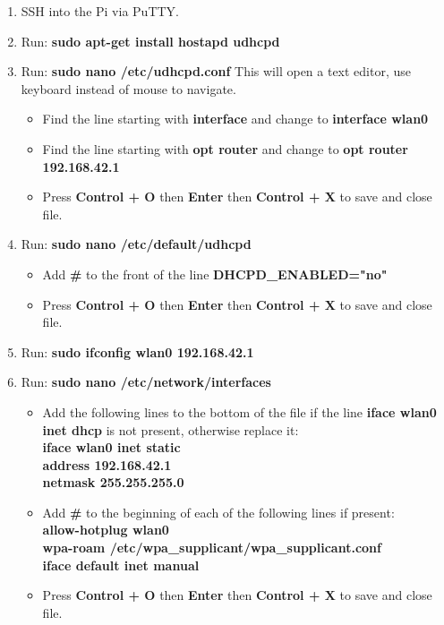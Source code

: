 \documentclass[titlepage,12pt,letter]{report}
\numberwithin{equation}{chapter}
\begin{document}
\begin{enumerate}[noitemsep,topsep=0pt]
	\item SSH into the Pi via PuTTY.
	\item Run: \textbf{sudo apt-get install hostapd udhcpd}
	\item Run: \textbf{sudo nano /etc/udhcpd.conf} This will open a text editor, use keyboard instead of mouse to navigate.
		\begin{itemize}[noitemsep,topsep=0pt]
			\item Find the line starting with \textbf{interface} and change to \textbf{interface wlan0}
			\item Find the line starting with \textbf{opt router} and change to \textbf{opt router 192.168.42.1}
			\item Press \textbf{Control + O} then \textbf{Enter} then \textbf{Control + X} to save and close file.
		\end{itemize}
	
	\item Run: \textbf{sudo nano /etc/default/udhcpd}
	\begin{itemize}[noitemsep,topsep=0pt]
		\item Add \textbf{\#} to the front of the line \textbf{DHCPD\_ENABLED="no"}
		\item Press \textbf{Control + O} then \textbf{Enter} then \textbf{Control + X} to save and close file.
	\end{itemize}

	\item Run: \textbf{sudo ifconfig wlan0 192.168.42.1}
	\item Run: \textbf{sudo nano /etc/network/interfaces}
	\begin{itemize}[noitemsep,topsep=0pt]
		\item Add the following lines to the bottom of the file if the line \textbf{iface wlan0 inet dhcp} is not present, otherwise replace it: \\
		\textbf{iface wlan0 inet static} \\
		\textbf{address 192.168.42.1} \\
		\textbf{netmask 255.255.255.0}
		\item Add \textbf{\#} to the beginning of each of the following lines if present: \\
		\textbf{allow-hotplug wlan0}\\
		\textbf{wpa-roam /etc/wpa\_supplicant/wpa\_supplicant.conf}\\
		\textbf{iface default inet manual}
		\item Press \textbf{Control + O} then \textbf{Enter} then \textbf{Control + X} to save and close file.
	\end{itemize}


\end{enumerate}
\end{document}
